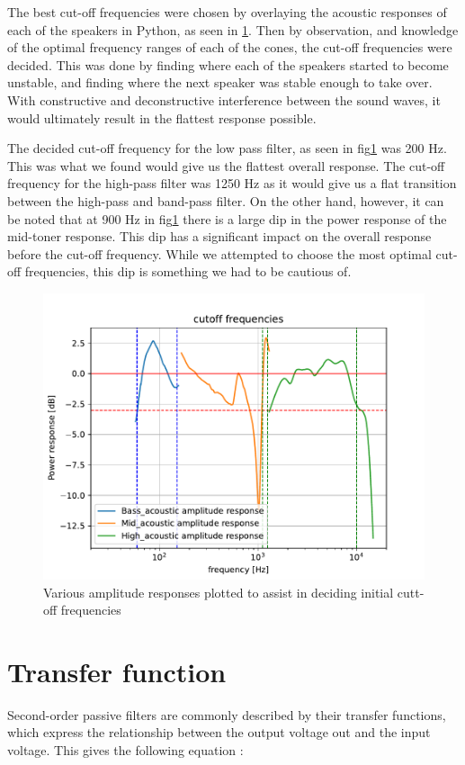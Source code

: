 The best cut-off frequencies were chosen by overlaying the acoustic responses of each of the speakers in Python, as seen in \ref{fig: Cutoff frequencies}. Then by observation, and knowledge of the optimal frequency ranges of each of the cones, the cut-off frequencies were decided. This was done by finding where each of the speakers started to become unstable, and finding where the next speaker was stable enough to take over. With constructive and deconstructive interference between the sound waves, it would ultimately result in the flattest response possible.

The decided cut-off frequency for the low pass filter, as seen in fig\ref{fig: Cutoff frequencies} was 200 Hz. This was what we found would give us the flattest overall response. The cut-off frequency for the high-pass filter was 1250 Hz as it would give us a flat transition between the high-pass and band-pass filter. On the other hand, however, it can be noted that at 900 Hz in fig\ref{fig: Cutoff frequencies} there is a large dip in the power response of the mid-toner response. This dip has a significant impact on the overall response before the cut-off frequency. While we attempted to choose the most optimal cut-off frequencies, this dip is something we had to be cautious of. 
\begin{figure}[H]
    \centering
    \includegraphics[width=0.6\linewidth]{TU Delft Booming Bass Project Report/figures/FilterGroup/chosenvalues.pdf}
    \captionsetup{justification=raggedright, labelfont=bf}
    \caption{Various amplitude responses plotted to assist in deciding initial cutt-off frequencies}
    \label{fig: Cutoff frequencies}
\end{figure}

\section{Transfer function}
Second-order passive filters are commonly described by their transfer functions, which express the relationship between the output voltage  out and the input voltage. This gives the following equation : 


